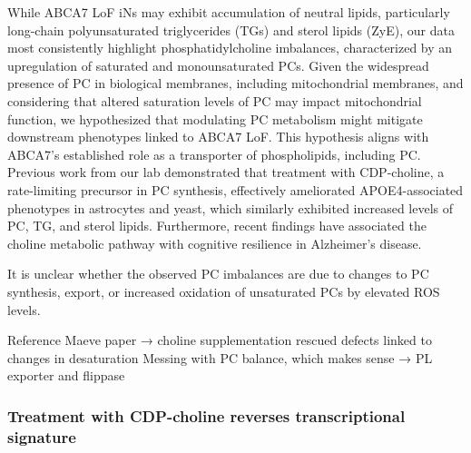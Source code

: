 While ABCA7 LoF iNs may exhibit accumulation of neutral lipids, particularly long-chain polyunsaturated triglycerides (TGs) and sterol lipids (ZyE), our data most consistently highlight phosphatidylcholine imbalances, characterized by an upregulation of saturated and monounsaturated PCs. Given the widespread presence of PC in biological membranes, including mitochondrial membranes, and considering that altered saturation levels of PC may impact mitochondrial function, we hypothesized that modulating PC metabolism might mitigate downstream phenotypes linked to ABCA7 LoF. This hypothesis aligns with ABCA7’s established role as a transporter of phospholipids, including PC. Previous work from our lab demonstrated that treatment with CDP-choline, a rate-limiting precursor in PC synthesis, effectively ameliorated APOE4-associated phenotypes in astrocytes and yeast, which similarly exhibited increased levels of PC, TG, and sterol lipids. Furthermore, recent findings have associated the choline metabolic pathway with cognitive resilience in Alzheimer’s disease.

It is unclear whether the observed PC imbalances are due to changes to PC synthesis, export, or increased oxidation of unsaturated PCs by elevated ROS levels.

Reference Maeve paper → choline supplementation rescued defects linked to changes in desaturation 
Messing with PC balance, which makes sense → PL exporter and flippase 

\subsubsection{Treatment with CDP-choline reverses transcriptional signature}

